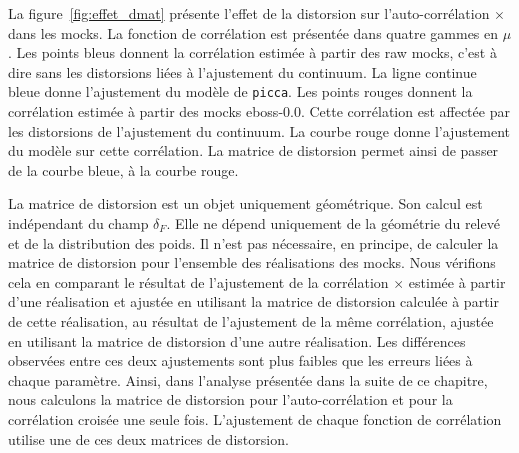 La figure~\ref{fig:effet_dmat} présente l'effet de la distorsion sur l'auto-corrélation \lya{}$\times$\lya{} dans les mocks. La fonction de corrélation est présentée dans quatre gammes en $\mu$. Les points bleus donnent la corrélation estimée à partir des raw mocks, c'est à dire sans les distorsions liées à l'ajustement du continuum. La ligne continue bleue donne l'ajustement du modèle de \texttt{picca}. Les points rouges donnent la corrélation estimée à partir des mocks eboss-0.0. Cette corrélation est affectée par les distorsions de l'ajustement du continuum. La courbe rouge donne l'ajustement du modèle sur cette corrélation. La matrice de distorsion permet ainsi de passer de la courbe bleue, à la courbe rouge.

La matrice de distorsion est un objet uniquement géométrique. Son calcul est indépendant du champ $\delta_F$. Elle ne dépend uniquement de la géométrie du relevé et de la distribution des poids.
  Il n'est pas nécessaire, en principe, de calculer la matrice de distorsion pour l'ensemble des réalisations des mocks.
  Nous vérifions cela en comparant le résultat de l'ajustement de la corrélation \lya{}$\times$\lya{} estimée à partir d'une réalisation et ajustée en utilisant la matrice de distorsion calculée à partir de cette réalisation, au résultat de l'ajustement de la même corrélation, ajustée en utilisant la matrice de distorsion d'une autre réalisation. Les différences observées entre ces deux ajustements sont plus faibles que les erreurs liées à chaque paramètre.
Ainsi, dans l'analyse présentée dans la suite de ce chapitre, nous calculons la matrice de distorsion pour l'auto-corrélation et pour la corrélation croisée une seule fois. L'ajustement de chaque fonction de corrélation utilise une de ces deux matrices de distorsion.

